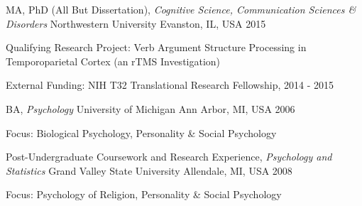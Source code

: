 
\vspace{1.0mm}
\begin{cventries}

  \cventry
    {MA, PhD (All But Dissertation), \textit{Cognitive Science, Communication Sciences \& Disorders}} %
    {Northwestern University} %
    {Evanston, IL, USA} %
    {2015} %
    {
      \begin{cvitems} %
        \item {Qualifying Research Project: Verb Argument Structure Processing in Temporoparietal Cortex (an rTMS Investigation)}
        \item {External Funding: NIH T32 Translational Research Fellowship, 2014 - 2015}
      \end{cvitems}
    }

  \cventry
    {BA, \textit{Psychology}} %
    {University of Michigan} %
    {Ann Arbor, MI, USA} %
    {2006} %
    {
    \begin{cvitems}
    \item {Focus: Biological Psychology, Personality \& Social Psychology}
    \end{cvitems}
    }
 \cventry
    {Post-Undergraduate Coursework and Research Experience, \textit{Psychology and Statistics}} %
    {Grand Valley State University} %
    {Allendale, MI, USA} %
    {2008} %
    {
    \begin{cvitems}
    \item {Focus: Psychology of Religion, Personality \& Social Psychology}
    \end{cvitems}
    }

\end{cventries}

